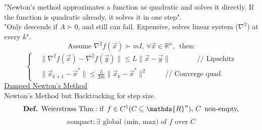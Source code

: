 \documentclass[twocolumn,12pt]{article}    %
\newcommand\Def{\text{\textbf{Def.}} \hspace{5pt}}
\newcommand \rn {\mathds{R}^n}
\newcommand \hfive {\hspace{5pt}}
\begin{document}
"Newton's method approximates a function as quadratic and solves it directly. If the function is quadratic already, it solves it in one step".\\
"Only descends if \(A\succ0\), and still can fail. Expensive, solves linear system (\(\nabla^2\)) at every \(k\)".
\begin{equation*}
    \text{Assume } \nabla^2 f(\vec{x}) \succ mI,\, \forall\vec{x} \in \mathds{R}^n,\,\text{ then:} 
\end{equation*}
\begin{equation*}
    \begin{cases}
        &\|\nabla^2 f(\vec{x}) - \nabla^2 f(\vec{y})\| \leq L \| \vec{x} - \vec{y}\| \hspace{45pt} \text{// Lipschitz}\\
        & \|\vec{x}_{k+1} - \vec{x}^* \| \leq \frac{L}{2m} \|\vec{x}_k -\vec{x}^* \|^2 \hspace{30pt} \text{// Converge quad.}
    \end{cases}
\end{equation*}
\noindent\underline{Damped Newton's Method}\\
Newton's Method but Backtracking for step size.\\
\begin{equation*}
    \Def \text{Weierstrass Thm} : \text{if} \hfive f\in C^1(C\subseteq \rn),\, C \hfive \text{non-empty,}
\end{equation*}
\begin{equation*}
    \text{compact}: \exists \hfive \text{global (min, max) of }f \text{ over } C
\end{equation*}


\end{document}
